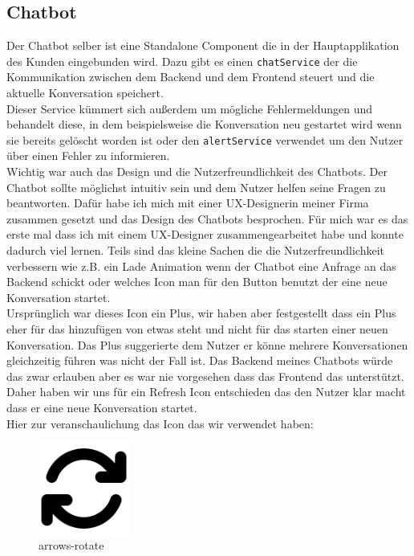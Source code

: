 \pagebreak
\subsection{Chatbot}\label{sec:umsetzung_chatbot}
Der Chatbot selber ist eine Standalone Component die in der Hauptapplikation des Kunden eingebunden wird. Dazu gibt es einen \lstinline|chatService| 
der die Kommunikation zwischen dem Backend und dem Frontend steuert und die aktuelle Konversation speichert.\\
Dieser Service kümmert sich außerdem um mögliche Fehlermeldungen und behandelt diese, in dem beispielsweise die Konversation neu gestartet wird wenn sie
bereits gelöscht worden ist oder den \lstinline|alertService| verwendet um den Nutzer über einen Fehler zu informieren.\\
Wichtig war auch das Design und die Nutzerfreundlichkeit des Chatbots. Der Chatbot sollte möglichst intuitiv sein und dem Nutzer helfen seine Fragen zu beantworten.
Dafür habe ich mich mit einer UX-Designerin meiner Firma zusammen gesetzt und das Design des Chatbots besprochen.
Für mich war es das erste mal dass ich mit einem UX-Designer zusammengearbeitet habe und konnte dadurch viel lernen.
Teils sind das kleine Sachen die die Nutzerfreundlichkeit verbessern wie z.B. ein Lade Animation wenn der Chatbot eine Anfrage an das Backend schickt oder welches Icon man für den Button benutzt
der eine neue Konversation startet.\\
Ursprünglich war dieses Icon ein Plus, wir haben aber festgestellt dass ein Plus eher für das hinzufügen von etwas steht und nicht für das starten einer neuen Konversation.
Das Plus suggerierte dem Nutzer er könne mehrere Konversationen gleichzeitig führen was nicht der Fall ist. Das Backend meines Chatbots würde das zwar erlauben aber
es war nie vorgesehen dass das Frontend das unterstützt. Daher haben wir uns für ein Refresh Icon entschieden das den Nutzer klar macht dass er eine neue Konversation startet.\\

Hier zur veranschaulichung das Icon das wir verwendet haben: \cite{fontawesome:refresh}\\
\begin{figure}[H]
    \begin{center}
        \includegraphics[width=3cm]{bilder/arrows-rotate-solid.png}
        \caption{arrows-rotate}\label{fig:refresh_fontawesome}
    \end{center}
\end{figure}